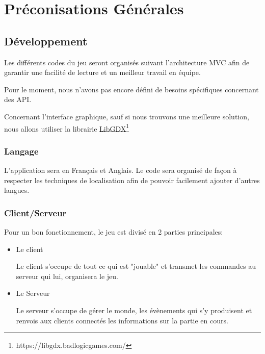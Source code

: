 \chapter{Préconisations Générales}
\label{sec:preconisationsGenerales}

\section{Développement}
Les différents codes du jeu seront organisés suivant l'architecture MVC afin de garantir une facilité de lecture et un meilleur travail en équipe.

Pour le moment, nous n'avons pas encore défini de besoins spécifiques concernant des API.

Concernant l'interface graphique, sauf si nous trouvons une meilleure solution, nous allons utiliser la librairie \href{https://libgdx.badlogicgames.com/}{LibGDX\footnote{https://libgdx.badlogicgames.com/}}

\subsection{Langage}
L'application sera en Français et Anglais. Le code sera organisé de façon à respecter les techniques de localisation afin de pouvoir facilement ajouter d'autres langues.

\subsection{Client/Serveur}
Pour un bon fonctionnement, le jeu est divisé en 2 parties principales:
\begin{itemize}
    \item Le client
    
    Le client s'occupe de tout ce qui est "jouable" et transmet les commandes au serveur qui lui, organisera le jeu.
    \item Le Serveur 
    
    Le serveur s'occupe de gérer le monde, les évènements qui s'y produisent et renvois aux clients connectés les informations sur la partie en cours.
\end{itemize}



